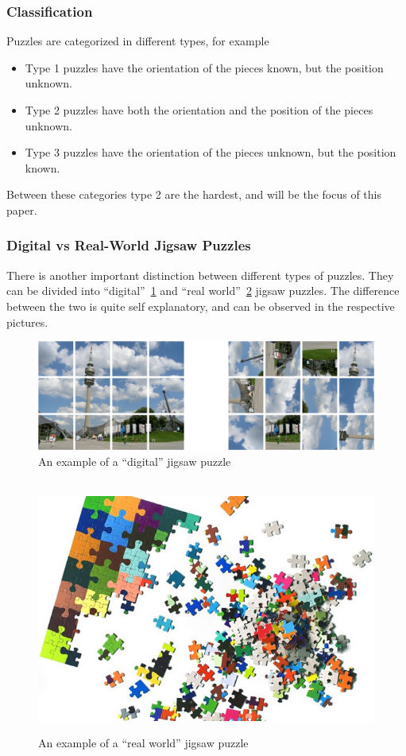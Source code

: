 \documentclass{article}
\begin{document}
\subsubsection{Classification}
Puzzles are categorized in different types, for example 
\begin{itemize}
  \item Type 1 puzzles have the orientation of the pieces known, but the position unknown. 
  \item Type 2 puzzles have both the orientation and the position of the pieces unknown.
  \item Type 3 puzzles have the orientation of the pieces unknown, but the position known.
\end{itemize}
Between these categories type 2 are the hardest, and will be the focus of this paper.

\subsubsection{Digital vs Real-World Jigsaw Puzzles}

There is  another important distinction between different types of puzzles.
They can be divided into “digital”~\cref{fig:figure_digital_puzzle} and
“real world”~\cref{fig:figure_real_puzzle} jigsaw puzzles.
The difference between the two is quite self explanatory,
and can be observed in the respective pictures.
\label{document:DigitalVSReal}

\begin{figure}[H]
    \caption{An example of a “digital” jigsaw  puzzle}\label{fig:figure_digital_puzzle}
    \centering
    \includegraphics[height=0.25\textwidth]{pictures/digital_puzzle.png}
\end{figure}

\begin{figure}[H]
    \caption{An example of a ``real world'' jigsaw  puzzle}~\label{fig:figure_real_puzzle}
    \includegraphics[height=0.25\textwidth]{pictures/real_puzzle.jpg}
    \centering

\end{figure}
\end{document}
